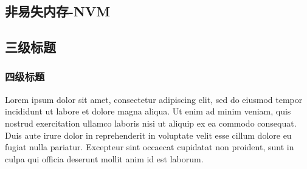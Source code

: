 \subsection{非易失内存-NVM}




\subsection{三级标题}

\subsubsection{四级标题}

Lorem ipsum dolor sit amet, consectetur adipiscing elit, sed do eiusmod tempor
incididunt ut labore et dolore magna aliqua. Ut enim ad minim veniam, quis
nostrud exercitation ullamco laboris nisi ut aliquip ex ea commodo consequat.
Duis aute irure dolor in reprehenderit in voluptate velit esse cillum dolore eu
fugiat nulla pariatur. Excepteur sint occaecat cupidatat non proident, sunt in
culpa qui officia deserunt mollit anim id est laborum.
